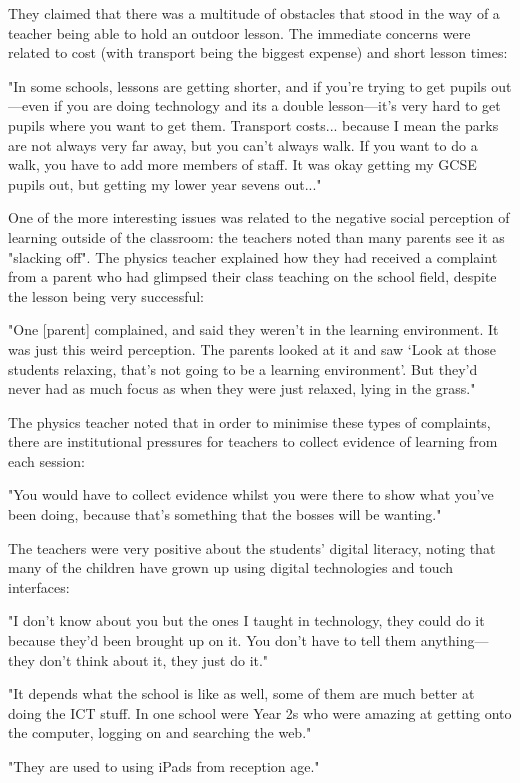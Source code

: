 They claimed that there was a multitude of obstacles that stood in the way of a teacher being able to hold an outdoor lesson. The immediate concerns were related to cost (with transport being the biggest expense) and short lesson times:

\begin{displayquote}
 "In some schools, lessons are getting shorter, and if you're trying to get pupils out---even if you are doing technology and its a double lesson---it's very hard to get pupils where you want to get them.  Transport costs... because I mean the parks are not always very far away, but you can't always walk. If you want to do a walk, you have to add more members of staff. It was okay getting my GCSE pupils out, but getting my lower year sevens out..."
\end{displayquote}

One of the more interesting issues was related to the negative social perception of learning outside of the classroom: the teachers noted than many parents see it as "slacking off". The physics teacher explained how they had received a complaint from a parent who had glimpsed their class teaching on the school field, despite the lesson being very successful:

\begin{displayquote}
"One [parent] complained, and said they weren't in the learning environment. It was just this weird perception. The parents looked at it and saw ‘Look at those students relaxing, that’s not going to be a
learning environment’. But they'd never had as much focus as when they were just relaxed, lying in the grass."
\end{displayquote}

The physics teacher noted that in order to minimise these types of complaints, there are institutional pressures for teachers to collect evidence of learning from each session:

\begin{displayquote}
"You would have to collect evidence whilst you were there to show what you've been doing, because that's something that the bosses will be wanting."
\end{displayquote}

The teachers were very positive about the students' digital literacy, noting that many of the children have grown up using digital technologies and touch interfaces:

\begin{displayquote}
"I don't know about you but the ones I taught in technology, they could do it because they'd been brought up on it. You don't have to tell them anything---they don't think about it, they just do it."

"It depends what the school is like as well, some of them are much better at doing the ICT stuff. In one school were Year 2s who were amazing at getting onto the computer, logging on and searching the web."

"They are used to using iPads from reception age."
\end{displayquote}

